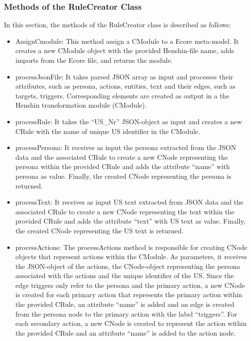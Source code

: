 \subsubsection*{Methods of the RuleCreator Class}
In this section, the methods of the RuleCreator class is described as follows:
\begin{itemize}
	
	\item AssignCmodule: This method assign a CModule to a Ecore meta-model. It creates a new CModule object with the provided Henshin-file name, adds imports from the Ecore file, and returns the module.
	
	\item processJsonFile: It takes parsed JSON array as input and processes their attributes, such as persona, actions, entities, text and their edges, such as targets, triggers. Corresponding elements are created as output in a the Henshin transformation module (CModule).
	
	\item processRule: It takes the \enquote{US\_Nr} JSON-object as input and creates a new CRule with the name of unique US identifier in the CModule.
	
	\item processPersona: It receives as input the persona extracted from the JSON data and the associated CRule to create a new CNode representing the persona within the provided CRule and adds the attribute \enquote{name} with persona as value. Finally, the created CNode representing the persona is returned.
	
	\item processText: It receives as input US text extracted from JSON data and the associated CRule to create a new CNode representing the text within the provided CRule and adds the attribute \enquote{text} with US text as value. Finally, the created CNode representing the US text is returned.
	
	\item processActions: The processActions method is responsible for creating CNode objects that represent actions within the CModule. As parameters, it receives the JSON-object of the actions, the CNode-object representing the persona associated with the actions and the unique identifier of the US. Since the edge triggers only refer to the persona and the primary action, a new CNode is created for each primary action that represents the primary action within the provided CRule, an attribute \enquote{name} is added and an edge is created from the persona node to the primary action with the label \enquote{triggers}. For each secondary action, a new CNode is created to represent the action within the provided CRule and an attribute \enquote{name} is added to the action node.
	

\end{itemize}
